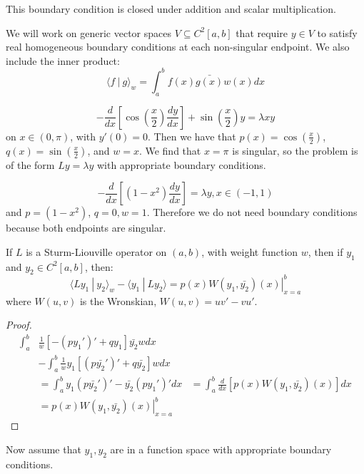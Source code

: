 \documentclass[../Main.tex]{subfiles}
\begin{document}
\begin{remark}
    This boundary condition is closed under addition and scalar multiplication.
\end{remark}
We will work on generic vector spaces $V \subseteq C^2[a, b]$ that require $y \in V$ to satisfy real homogeneous boundary conditions at each non-singular endpoint. We also include the inner product:
\begin{equation*}
    \langle f~|~g\rangle_w = \int_{a}^{b} f(x) \bar{g(x)} w(x) dx 
\end{equation*}
\begin{examples}
    \item \begin{equation*}
        -\frac{d}{dx}\left[\cos\left(\frac{x}{2}\right)\frac{dy}{dx}\right] + \sin\left(\frac{x}{2}\right)y = \lambda x y
    \end{equation*}
    on $x \in (0, \pi)$, with $y'(0) = 0$. Then we have that $p(x) = \cos\left(\frac{x}{2}\right)$, $q(x) = \sin\left(\frac{x}{2}\right)$, and $w = x$. We find that $x = \pi$ is singular, so the problem is of the form $Ly = \lambda y$ with appropriate boundary conditions.
    \item \begin{equation*}
        -\frac{d}{dx}\left[(1 - x^2)\frac{dy}{dx}\right] = \lambda y, x \in (-1, 1)
    \end{equation*}
    and $p = (1 - x^2)$, $q = 0, w=1$. Therefore we do not need boundary conditions because both endpoints are singular.
\end{examples}
\begin{proposition}
    If $L$ is a Sturm-Liouville operator on $(a, b)$, with weight function $w$, then if $y_1$ and $y_2 \in C^2[a, b]$, then:
    \begin{equation}
        \langle Ly_1~|~y_2\rangle_w - \langle y_1~|~Ly_2\rangle = \left. p(x) W(y_1, \bar{y_2})(x)\right|_{x = a}^b
        \label{eqnSLWronskian}
    \end{equation}
    where $W(u, v)$ is the Wronskian, $W(u, v) = uv' - vu'$.
    \label{propSLWronskian}
\end{proposition}
\begin{proof}
    \begin{align*}
        \int_{a}^{b} &\frac{1}{w}\left[-(py_1')' + qy_1\right]\bar{y_2} w dx \\
        &- \int_{a}^{b} \frac{1}{w}y_1\left[ (p\bar{y_2}')' + q\bar{y_2}\right] w dx \\
        &=\int_{a}^{b} y_1 \left(p\bar{y_2}'\right)' - \bar{y_2} \left(py_1'\right)' dx 
        &= \int_{a}^{b} \frac{d}{dx}\left[p(x) W(y_1, \bar{y_2})(x)\right] dx \\
        &= \left.p(x) W(y_1, \bar{y_2})(x)\right|_{x = a}^b
    \end{align*}
\end{proof}
Now assume that $y_1, y_2$ are in a function space with appropriate boundary conditions.
\end{document}
